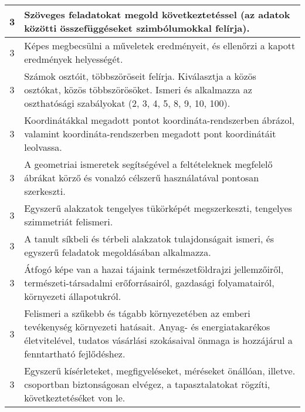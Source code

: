 \begin{longtable}{c | p{12cm} }
                                
                                          3 &  Szöveges feladatokat megold következtetéssel (az adatok közötti összefüggéseket szimbólumokkal felírja). \\ \hline
                                          3 &  Képes megbecsülni a műveletek eredményeit, és ellenőrzi a kapott eredmények helyességét. \\ \hline
                                          3 &  Számok osztóit, többszöröseit felírja. Kiválasztja a közös osztókat, közös többszörösöket. Ismeri és alkalmazza az oszthatósági szabályokat (2, 3, 4, 5, 8, 9, 10, 100). \\ \hline
                                          3 &  Koordinátákkal megadott pontot koordináta-rendszerben ábrázol, valamint koordináta-rendszerben megadott pont koordinátáit leolvassa. \\ \hline
                                          3 &  A geometriai ismeretek segítségével a feltételeknek megfelelő ábrákat körző és vonalzó célszerű használatával pontosan szerkeszti. \\ \hline
                                          3 &  Egyszerű alakzatok tengelyes tükörképét megszerkeszti, tengelyes szimmetriát felismeri. \\ \hline
                                          3 &  A tanult síkbeli és térbeli alakzatok tulajdonságait ismeri, és egyszerű feladatok megoldásában alkalmazza. \\ \hline
                                          3 &  Átfogó képe van a hazai tájaink természetföldrajzi jellemzőiről, természeti-társadalmi erőforrásairól, gazdasági folyamatairól, környezeti állapotukról. \\ \hline
                                          3 &  Felismeri a szűkebb és tágabb környezetében az emberi tevékenység környezeti hatásait. Anyag- és energiatakarékos életvitelével, tudatos vásárlási szokásaival önmaga is hozzájárul a fenntartható fejlődéshez. \\ \hline
                                          3 &  Egyszerű kísérleteket, megfigyeléseket, méréseket önállóan, illetve. csoportban biztonságosan elvégez, a tapasztalatokat rögzíti, következtetéséket von le. \\ \hline
                                      

\end{longtable}
